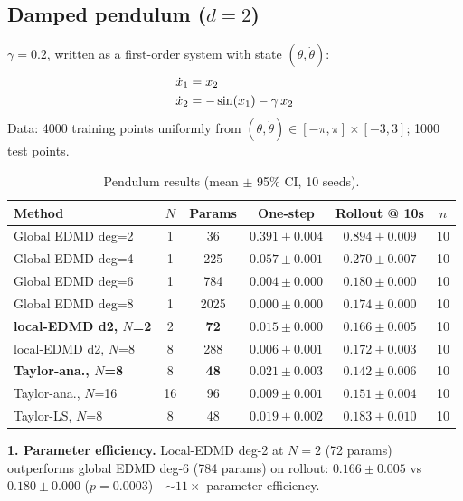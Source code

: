 \documentclass[11pt]{article}
\theoremstyle{definition}
\begin{document}
\subsection{Damped pendulum ($d=2$)}

$\gamma=0.2$, written as a first-order system with state $(\theta,\dot{\theta})$:
\begin{align}
  \dot{x}_1 &= x_2 \notag \\
  \dot{x}_2 &= -\sin(x_1) - \gamma\, x_2 \notag
\end{align} Data: 4000 training points uniformly from $(\theta,\dot{\theta})\in[-\pi,\pi]\times[-3,3]$; 1000 test points.

\begin{table}[H]
\centering\small
\begin{tabular}{lccccc}
\toprule
Method & $N$ & Params & One-step & Rollout @ 10s & $n$ \\
\midrule
Global EDMD deg=2 & 1 & 36   & $0.391\pm0.004$ & $0.894\pm0.009$ & 10 \\
Global EDMD deg=4 & 1 & 225  & $0.057\pm0.001$ & $0.270\pm0.007$ & 10 \\
Global EDMD deg=6 & 1 & 784  & $0.004\pm0.000$ & $0.180\pm0.000$ & 10 \\
Global EDMD deg=8 & 1 & 2025 & $0.000\pm0.000$ & $0.174\pm0.000$ & 10 \\
\textbf{local-EDMD d2, $N$=2}     & 2  & \textbf{72}  & $0.015\pm0.000$ & $\mathbf{0.166\pm0.005}$ & 10 \\
local-EDMD d2, $N$=8              & 8  & 288          & $0.006\pm0.001$ & $0.172\pm0.003$ & 10 \\
\textbf{Taylor-ana., $N$=8}       & 8  & \textbf{48}  & $0.021\pm0.003$ & $\mathbf{0.142\pm0.006}$ & 10 \\
Taylor-ana., $N$=16               & 16 & 96           & $0.009\pm0.001$ & $0.151\pm0.004$ & 10 \\
Taylor-LS, $N$=8                  & 8  & 48           & $0.019\pm0.002$ & $0.183\pm0.010$ & 10 \\
\bottomrule
\end{tabular}
\caption{Pendulum results (mean $\pm$ 95\% CI, 10 seeds).}
\label{tab:pendulum}
\end{table}

\textbf{1. Parameter efficiency.} Local-EDMD deg-2 at $N=2$ (72 params) outperforms global EDMD deg-6 (784 params) on rollout: $0.166\pm0.005$ vs $0.180\pm0.000$ ($p=0.0003$)---$\sim\!11\times$ parameter efficiency.
\end{document}
